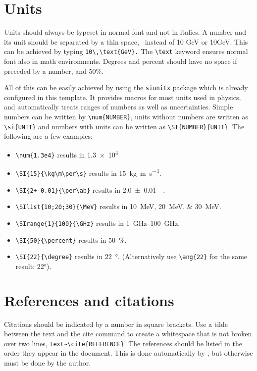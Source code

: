 \section{Units}
\label{sec:units}

Units should always be typeset in normal font and not in italics. A number and its unit should be separated by a thin space, \, instead of 10 GeV or 10GeV. This can be achieved by typing \texttt{10\textbackslash,\textbackslash text\{GeV\}.} The \texttt{\textbackslash text} keyword ensures normal font also in math environments. Degrees and percent should have no space if preceded by a number, \degrees and 50\%.

All of this can be easily achieved by using the \texttt{siunitx} package which is already configured in this template. It provides macros for most units used in physics, and automatically treats ranges of numbers as well as uncertainties. Simple numbers can be written by \texttt{\textbackslash num\{NUMBER\}}, units without numbers are written as \texttt{\textbackslash si\{UNIT\}} and numbers with units can be written as \texttt{\textbackslash SI\{NUMBER\}\{UNIT\}}. The following are a few examples:
\begin{itemize}
  \item \texttt{\textbackslash num\{1.3e4\}} results in \num{1.3e4}
  \item \texttt{\textbackslash SI\{15\}\{\textbackslash kg\textbackslash m\textbackslash per\textbackslash s\}} results in \SI{15}{\kg\m\per\s}.
  \item \texttt{\textbackslash SI\{2+-0.01\}\{\textbackslash per\textbackslash ab\}} results in \SI{2.0+-0.01}{\per\ab}.
  \item \texttt{\textbackslash SIlist\{10;20;30\}\{\textbackslash MeV\}} results in \SIlist{10;20;30}{\MeV}.
  \item \texttt{\textbackslash SIrange\{1\}\{100\}\{\textbackslash GHz\}} results in \SIrange{1}{100}{\GHz}.
  \item \texttt{\textbackslash SI\{50\}\{\textbackslash percent\}} results in \SI{50}{\percent}.
  \item \texttt{\textbackslash SI\{22\}\{\textbackslash degree\}} results in \SI{22}{\degree}. (Alternatively use \texttt{\textbackslash ang\{22\}} for the same result: \ang{22}).
\end{itemize}


\section{References and citations}
\label{sec:cite}
Citations should be indicated by a number in square brackets. Use a tilde between the text and the cite command to create a whitespace that is not broken over two lines, \ie \texttt{text\textasciitilde\textbackslash cite\{REFERENCE\}}. The references should be listed in the order they appear in the document. This is done automatically by \latex, but otherwise must be done by the author.

